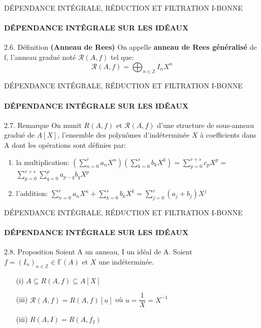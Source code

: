 \documentclass[11pt,a4paper]{beamer}
\begin{document}
\begin{frame}{DÉPENDANCE INTÉGRALE, RÉDUCTION ET FILTRATION I-BONNE}
	\framesubtitle{DÉPENDANCE INTÉGRALE SUR LES IDÉAUX}
	\begin{block}{2.6. Définition \textbf{(Anneau de Rees)}}
		On appelle \textbf{anneau de Rees généralisé} de f, l'anneau gradué noté $\mathcal{R}(A,f)$ tel que: 
		\[ \mathcal{R}(A,f) = \displaystyle \bigoplus_{n \in \mathbb{Z}}{I_n X^n}  \]
	\end{block}
\end{frame}


\begin{frame}{DÉPENDANCE INTÉGRALE, RÉDUCTION ET FILTRATION I-BONNE}
	\framesubtitle{DÉPENDANCE INTÉGRALE SUR LES IDÉAUX}
	\begin{alertblock}{2.7. Remarque}
			On munit $R(A,f)$ et $\mathcal{R}(A,f)$ d'une structure de sous-anneau gradué de $A[X]$, l'ensemble des polynômes d'indéterminée $X$ à coefficients dans A dont les opérations sont définies par:
		
		\begin{enumerate}
			\item la multiplication:	$(\sum\limits_{n=0}^{r}a_{n}X^{n})(\sum\limits_{k=0}^{s}b_{k}X^{k})=\sum	\limits_{p=0}^{r+s}c_{p}X^{p}=$ $\sum\limits_{p=0}^{r+s}\sum\limits_{q=0}^{p}a_{p-q}b_{q}X^{p}$ \pause
			\item l'addition:   $\sum\limits_{n=0}^{r}a_{n}X^{n}+\sum\limits_{k=0}^{s}b_{k}X^{k}=\sum\limits_{j=0}^{r}(a_{j}+b_{j})X^{j}$
		\end{enumerate}
	\end{alertblock}
\end{frame}

\begin{frame}{DÉPENDANCE INTÉGRALE, RÉDUCTION ET FILTRATION I-BONNE}
	\framesubtitle{DÉPENDANCE INTÉGRALE SUR LES IDÉAUX}
	\begin{block}{2.8. Proposition}
		Soient A un anneau, I un idéal de A. Soient $f = (I_n)_{n \in \mathbb{Z}} \in \mathbb{F}(A)$ et $X$ une indéterminée.
	\begin{enumerate}
		\item[(i)] $A \subseteq R(A,f) \subseteq A[X]$ \pause
		\item[(iii)] $\mathcal{R}(A,f) = R(A,f)[u] $ où $u = \dfrac{1}{X} = X^{-1}$ \pause
		\item[(iii)] $R(A,I) = R(A, f_I) $
	\end{enumerate} 
	\end{block}
\end{frame}
\end{document}
